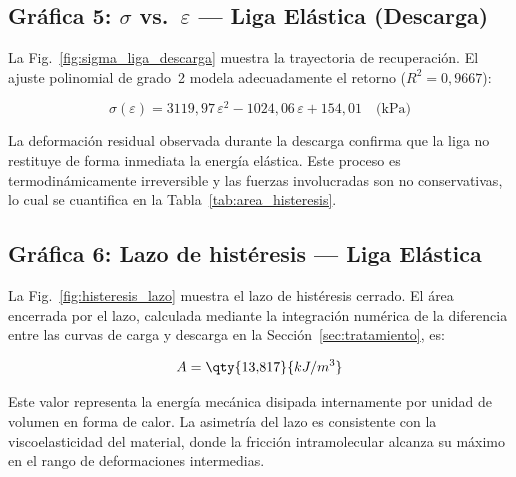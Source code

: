 \subsection{Gráfica 5: \texorpdfstring{$\sigma$ vs.\ $\varepsilon$}{sigma vs. epsilon} — Liga Elástica (Descarga)}

La Fig.~\ref{fig:sigma_liga_descarga} muestra la trayectoria de recuperación. 
El ajuste polinomial de grado~2 modela adecuadamente el retorno ($R^2 = 0{,}9667$):

\begin{equation*}
    \sigma(\varepsilon) = 3119{,}97\,\varepsilon^2 - 1024{,}06\,\varepsilon
                        + 154{,}01 \quad \text{(kPa)}
\end{equation*}

La deformación residual observada durante la descarga confirma que la liga 
no restituye de forma inmediata la energía elástica. Este proceso es 
termodinámicamente irreversible y las fuerzas involucradas son no conservativas, 
lo cual se cuantifica en la Tabla~\ref{tab:area_histeresis}.

\subsection{Gráfica 6: Lazo de histéresis — Liga Elástica}

La Fig.~\ref{fig:histeresis_lazo} muestra el lazo de histéresis cerrado. 
El área encerrada por el lazo, calculada mediante la integración numérica de la 
diferencia entre las curvas de carga y descarga en la 
Sección~\ref{sec:tratamiento}, es:

\begin{equation*}
    A = \qty{13{,}817}{kJ/m^3}
\end{equation*}

Este valor representa la energía mecánica disipada internamente por unidad de 
volumen en forma de calor. La asimetría del lazo es consistente con la 
viscoelasticidad del material, donde la fricción intramolecular alcanza su 
máximo en el rango de deformaciones intermedias.
